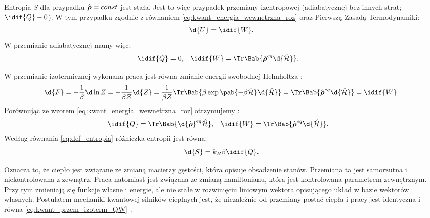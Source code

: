 Entropia \(S\) dla przypadku \(\vu{\rho} = const\) jest stała. Jest to więc przypadek przemiany izentropowej (adiabatycznej bez innych strat; \(\idif{Q} - 0\)). W tym przypadku zgodnie z równaniem \eqref{eq:kwant_energia_wewnetrzna_roz} oraz  Pierwszą Zasadą Termodynamiki:
\begin{equation*}
	\d{U} = \idif{W}.
\end{equation*}
W przemianie adiabatycznej mamy więc:
\begin{align}\label{eq:kwant_przem_adiab_QW}
	\idif{Q} &= 0, &
	\idif{W} &= \Tr\Bab{\vu{\rho}^{eq} \d{\ham}}.
\end{align}

W przemianie izotermicznej wykonana praca jest równa zmianie energii swobodnej Helmholtza \cite{b:pudlik_termodynamika, deffner_quantum_thermodynamics}:
\begin{equation*}
	\d{F} = - \inv{\beta} \d\ln Z =
	- \inv{\beta Z} \d{Z} =
	\inv{\beta Z} \Tr\Bab{\beta\exp\pab{-\beta\ham} \d{\ham}} =
	\Tr\Bab{\vu{\rho}^{eq} \d{\ham}} = \idif{W}.
\end{equation*}
Porównując ze wzorem \eqref{eq:kwant_energia_wewnetrzna_roz} otrzymujemy \cite{strasberg}:
\begin{align}\label{eq:kwant_przem_izoterm_QW}
	\idif{Q} &= \Tr\Bab{\d{\vu{\rho}}^{eq} \ham}, &
	\idif{W} &= \Tr\Bab{\vu{\rho}^{eq} \d{\ham}}.
\end{align}
Według równania \eqref{eq:def_entropia} różniczka entropii jest równa:
\begin{equation}\label{eq:kwant_przem_izoterm_dS}
	\d{S} = k_B \beta \idif{Q}.
\end{equation}

Oznacza to, że ciepło jest związane ze zmianą macierzy gęstości, która opisuje obsadzenie stanów. Przemiana ta jest samorzutna i niekontrolowana z zewnątrz. Praca natomiast jest związana ze zmianą hamiltonianu, która jest kontrolowana parametrem zewnętrznym. Przy tym zmieniają się funkcje własne i energie, ale nie stałe w rozwinięciu liniowym wektora opisującego układ w bazie wektorów własnych. Postulatem mechaniki kwantowej silników cieplnych jest, że niezależnie od przemiany postać ciepła i pracy jest identyczna i równa \eqref{eq:kwant_przem_izoterm_QW} \cite{kieu}.

